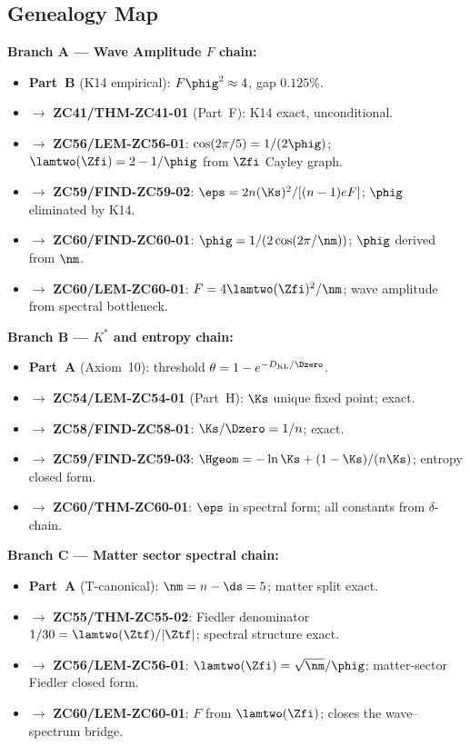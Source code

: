 \documentclass[12pt, a4paper]{article}
\begin{document}
\subsection{Genealogy Map}
\label{sec:genealogy}

\begin{genealogybox}[title={How ZC60's Key Objects Trace Back
  through the Z-Programme}]
\textbf{Branch A --- Wave Amplitude $F$ chain:}
\begin{itemize}[leftmargin=2em, noitemsep]
\item \textbf{Part~B} (K14 empirical): $F\phig^2\approx4$,
  gap $0.125\%$.
\item $\to$ \textbf{ZC41/THM-ZC41-01} (Part~F): K14 exact,
  unconditional.
\item $\to$ \textbf{ZC56/LEM-ZC56-01}: $\cos(2\pi/5)=1/(2\phig)$;
  $\lamtwo(\Zfi)=2-1/\phig$ from $\Zfi$ Cayley graph.
\item $\to$ \textbf{ZC59/FIND-ZC59-02}: $\eps=2n(\Ks)^2/[(n-1)eF]$;
  $\phig$ eliminated by K14.
\item $\to$ \textbf{ZC60/FIND-ZC60-01}: $\phig=1/(2\cos(2\pi/\nm))$;
  $\phig$ derived from $\nm$.
\item $\to$ \textbf{ZC60/LEM-ZC60-01}: $F=4\lamtwo(\Zfi)^2/\nm$;
  wave amplitude from spectral bottleneck.
\end{itemize}

\textbf{Branch B --- $K^*$ and entropy chain:}
\begin{itemize}[leftmargin=2em, noitemsep]
\item \textbf{Part~A} (Axiom~10): threshold $\theta=1-e^{-D_{\rm KL}/\Dzero}$.
\item $\to$ \textbf{ZC54/LEM-ZC54-01} (Part~H): $\Ks$ unique fixed
  point; exact.
\item $\to$ \textbf{ZC58/FIND-ZC58-01}: $\Ks/\Dzero=1/n$; exact.
\item $\to$ \textbf{ZC59/FIND-ZC59-03}: $\Hgeom=-\ln\Ks+(1-\Ks)/(n\Ks)$;
  entropy closed form.
\item $\to$ \textbf{ZC60/THM-ZC60-01}: $\eps$ in spectral form;
  all constants from $\delta$-chain.
\end{itemize}

\textbf{Branch C --- Matter sector spectral chain:}
\begin{itemize}[leftmargin=2em, noitemsep]
\item \textbf{Part~A} (T-canonical): $\nm=n-\ds=5$; matter
  split exact.
\item $\to$ \textbf{ZC55/THM-ZC55-02}: Fiedler denominator
  $1/30 = \lamtwo(\Ztf)/|\Ztf|$; spectral structure exact.
\item $\to$ \textbf{ZC56/LEM-ZC56-01}: $\lamtwo(\Zfi)=\sqrt{\nm}/\phig$;
  matter-sector Fiedler closed form.
\item $\to$ \textbf{ZC60/LEM-ZC60-01}: $F$ from $\lamtwo(\Zfi)$;
  closes the wave--spectrum bridge.
\end{itemize}


\end{genealogybox}
\end{document}
